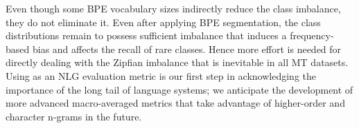 Even though some BPE vocabulary sizes indirectly reduce the class imbalance, they do not eliminate it.
Even after applying BPE segmentation, the class distributions remain to possess sufficient imbalance that induces a frequency-based bias and affects the recall of rare classes.
Hence more effort is needed for directly dealing with the Zipfian imbalance that is inevitable in all MT datasets.
Using  as an NLG evaluation metric is our first step in acknowledging the importance of the long tail of language systems; we anticipate the development of more advanced macro-averaged metrics that take advantage of higher-order and character n-grams in the future. 